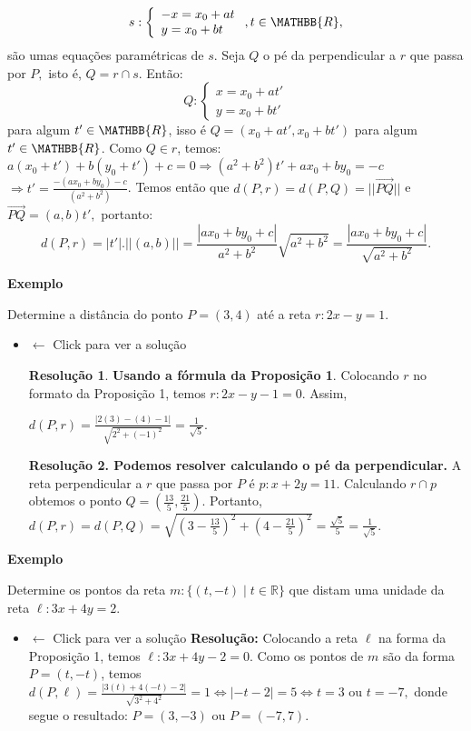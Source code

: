 \documentclass[
  brazilian,
  letterpaper,
  DIV=11,
  numbers=noendperiod]{scrreprt}
\providecommand{\tightlist}{%
  \setlength{\itemsep}{0pt}\setlength{\parskip}{0pt}}
\theoremstyle{definition}
\theoremstyle{plain}
\theoremstyle{definition}
\theoremstyle{remark}
\begin{document}
\[
s:\left\{ \begin{array}{l} -x=x_0+at \\ y=x_0+bt  \end{array} \right. , t\in \MATHBB{R},
\] são umas equações paramétricas de \(s\). Seja \(Q\) o pé da
perpendicular a \(r\) que passa por \(P,\) isto é, \(Q=r\cap s\). Então:
\[
Q:\left\{ \begin{array}{l} x=x_0+at' \\ y=x_0+bt'  \end{array} \right. 
\] para algum \(t' \in \MATHBB{R}\), isso é \(Q=(x_0+at', x_0+bt')\)
para algum \(t' \in \MATHBB{R}\). Como \(Q \in r\), temos:
\(a(x_0+t')+b(y_0+t') + c=0\Rightarrow  (a^2+b^2)t'+ax_0+by_0=-c\)
\(\Rightarrow t'=\frac{-(ax_0+by_0)-c}{(a^2+b^2)}\). Temos então que
\(d(P,r)=d(P,Q)=||\overrightarrow{PQ}||\) e
\(\overrightarrow{PQ}=(a,b)t',\) portanto: \[
d(P,r)=|t'|.||(a,b)||=\frac{|ax_0+by_0+c|}{a^2+b^2}\sqrt{a^2+b^2} = \frac{|ax_0+by_0+c|}{\sqrt{a^2+b^2}}.
\]

\textbf{Exemplo}

Determine a distância do ponto \(P=(3,4)\) até a reta \(r:2x-y=1\).

\begin{itemize}
\item
  \(\leftarrow\) Click para ver a solução

  \textbf{Resolução 1}. \textbf{Usando a fórmula da Proposição 1}.
  Colocando \(r\) no formato da Proposição 1, temos \(r:2x-y-1=0\).
  Assim,

  \(d(P,r)=\frac{|2(3)-(4)-1|}{\sqrt{2^2+(-1)^2}}=\frac{1}{\sqrt{5}}.\)

  \textbf{Resolução 2. Podemos resolver calculando o pé da
  perpendicular.} A reta perpendicular a \(r\) que passa por \(P\) é
  \(p:x+2y=11\). Calculando \(r\cap p\) obtemos o ponto
  \(Q=\left(\frac{13}{5},\frac{21}{5}\right)\). Portanto,
  \(d(P,r)=d(P,Q)=\sqrt{\left(3-\frac{13}{5}\right)^2+\left(4-\frac{21}{5}\right)^2}=\frac{\sqrt{5}}{5}=\frac{1}{\sqrt{5}}.\)
\end{itemize}

\textbf{Exemplo}

Determine os pontos da reta \(m:\{(t,-t) \mid t \in \mathbb{R} \}\) que
distam uma unidade da reta \(\ell:3x+4y=2\).

\begin{itemize}
\tightlist
\item
  \(\leftarrow\) Click para ver a solução \textbf{Resolução:} Colocando
  a reta \(\ell\) na forma da Proposição 1, temos \(\ell:3x+4y-2=0\).
  Como os pontos de \(m\) são da forma \(P=(t,-t)\), temos
  \(d(P,\ell)=\frac{|3(t)+4(-t)-2|}{\sqrt{3^2+4^2}}=1 \Leftrightarrow |-t-2|=5 \Leftrightarrow t=3 \text{ ou } t=-7,\)
  donde segue o resultado: \(P=(3,-3) \text{ ou } P=(-7,7).\)
\end{itemize}
\end{document}
